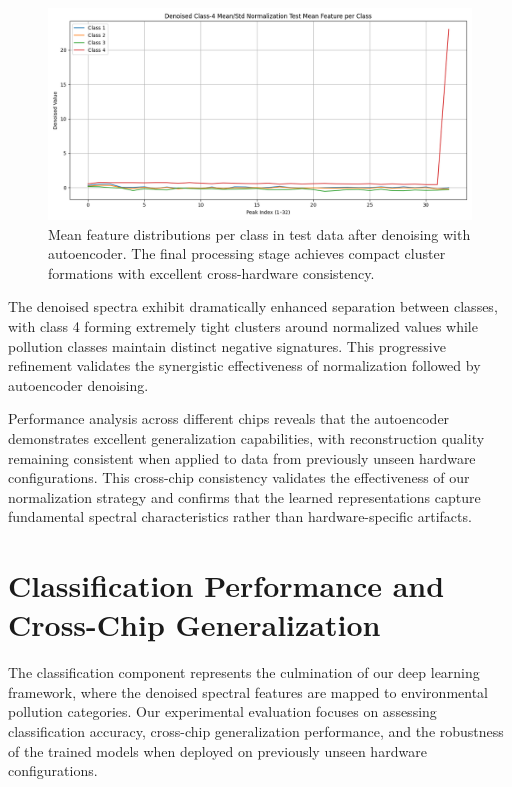 \begin{figure}[H]
\centering
\includegraphics[width=\textwidth]{out/class_based_mean_std_normalized/denoised_class_based_mean_std_normalized_test_mean_feature_per_class.png}
\caption{Mean feature distributions per class in test data after denoising with autoencoder. The final processing stage achieves compact cluster formations with excellent cross-hardware consistency.}
\label{fig:denoised_test_features}
\end{figure}

The denoised spectra exhibit dramatically enhanced separation between classes, with class 4 forming extremely tight clusters around normalized values while pollution classes maintain distinct negative signatures. This progressive refinement validates the synergistic effectiveness of normalization followed by autoencoder denoising.

Performance analysis across different chips reveals that the autoencoder demonstrates excellent generalization capabilities, with reconstruction quality remaining consistent when applied to data from previously unseen hardware configurations. This cross-chip consistency validates the effectiveness of our normalization strategy and confirms that the learned representations capture fundamental spectral characteristics rather than hardware-specific artifacts.

\section{Classification Performance and Cross-Chip Generalization}
\label{sec:classification_performance}

The classification component represents the culmination of our deep learning framework, where the denoised spectral features are mapped to environmental pollution categories. Our experimental evaluation focuses on assessing classification accuracy, cross-chip generalization performance, and the robustness of the trained models when deployed on previously unseen hardware configurations.


